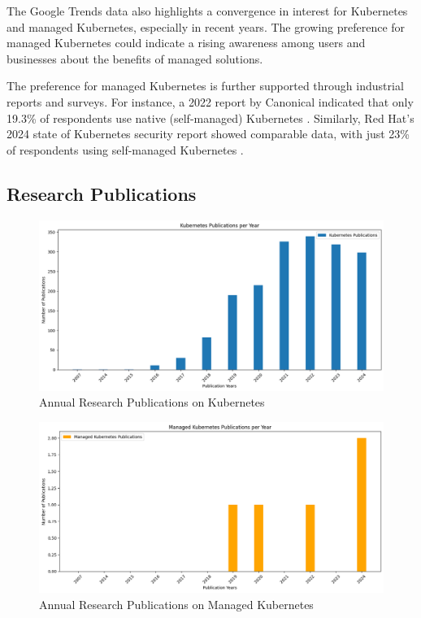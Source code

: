 The Google Trends data also highlights a convergence in interest for Kubernetes and managed Kubernetes, especially in recent years. The growing preference for managed Kubernetes could indicate a rising awareness among users and businesses about the benefits of managed solutions.

The preference for managed Kubernetes is further supported through industrial reports and surveys. For instance, a 2022 report by Canonical indicated that only 19.3\% of respondents use native (self-managed) Kubernetes \cite{canonicalKubernetesCloudNative2022}. Similarly, Red Hat's 2024 state of Kubernetes security report showed comparable data, with just 23\% of respondents using self-managed Kubernetes \cite{redhatinc.StateKubernetesSecurity2024}.

\subsection{Research Publications}\label{subsec:research-publications}

\FloatBarrier

\begin{figure}
    \centering
    \includegraphics[width=1\linewidth]{resources/publications-plot-k8s.png}
    \caption{Annual Research Publications on Kubernetes}
    \label{fig:research-publications-kubernetes-and-managed-kubernetes}
\end{figure}


\begin{figure}
    \centering
    \includegraphics[width=1\linewidth]{resources/publications-plot-managed-k8s.png}
    \caption{Annual Research Publications on Managed Kubernetes}
    \label{fig:research-publications-managed-kubernetes}
\end{figure}

